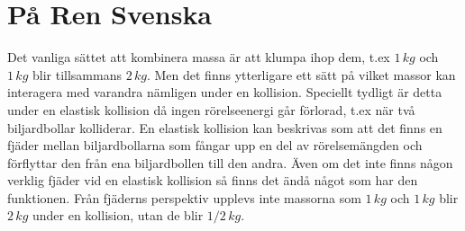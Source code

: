 \documentclass[]{../common/elementary-physics}
\begin{document}
\section{På Ren Svenska}

Det vanliga sättet att kombinera massa är att klumpa ihop dem, t.ex $1 \, kg$ och $1 \, kg$ blir tillsammans $2 \, kg$.
Men det finns ytterligare ett sätt på vilket massor kan interagera med varandra nämligen under en kollision.
Speciellt tydligt är detta under en elastisk kollision då ingen rörelseenergi går förlorad, t.ex när två biljardbollar kolliderar.
En elastisk kollision kan beskrivas som att det finns en fjäder mellan biljardbollarna som fångar upp en del av rörelsemängden och förflyttar den från ena biljardbollen till den andra.
Även om det inte finns någon verklig fjäder vid en elastisk kollision så finns det ändå något som har den funktionen.
Från fjäderns perspektiv upplevs inte massorna som $1 \, kg$ och $1 \, kg$ blir $2 \, kg$ under en kollision, utan de blir $1/2 \, kg$.



\printbibliography
\end{document}

